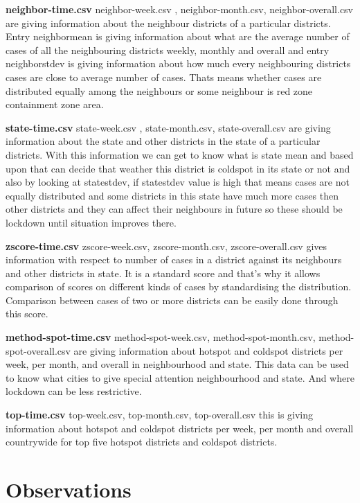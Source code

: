 \documentclass[letterpaper,12pt]{article}
\begin{document}
\textbf{neighbor-time.csv }
neighbor-week.csv , neighbor-month.csv, neighbor-overall.csv are giving information about the neighbour districts of a particular districts. Entry neighbormean is giving information about what are the average number of cases of all the neighbouring districts weekly, monthly and overall and entry neighborstdev is giving information about how much every neighbouring districts cases are close to average number of cases. Thats means whether cases are distributed equally among the neighbours or some neighbour is red zone containment zone area.  

\textbf{state-time.csv }
state-week.csv , state-month.csv, state-overall.csv are giving information about the state and other districts in the state of a particular districts. With this information we can get to know what is state mean and based upon that can decide that weather this district is coldspot in its state or not and also by looking at statestdev, if statestdev value is high that means cases are not equally distributed and some districts in this state have much more cases then other districts and they can affect their neighbours in future so these should be lockdown until situation improves there. 

\textbf{ zscore-time.csv }
zscore-week.csv, zscore-month.csv, zscore-overall.csv gives information with respect to number of cases in a district against its neighbours and other districts in state. It is a standard score and that’s why it allows comparison of scores on different kinds of cases by standardising the distribution. Comparison between cases of two or more districts can be easily done through this score.

\textbf{method-spot-time.csv  }
method-spot-week.csv, method-spot-month.csv, method-spot-overall.csv are giving information about hotspot and coldspot districts per week, per month, and overall in neighbourhood and state. This data can be used to know what cities to give special attention neighbourhood and state. And where lockdown can be less restrictive. 

\textbf{top-time.csv  }
top-week.csv, top-month.csv, top-overall.csv this is giving information about hotspot and coldspot districts per week, per month and overall countrywide for top five hotspot districts and coldspot districts. 

\section{Observations}
\end{document}
